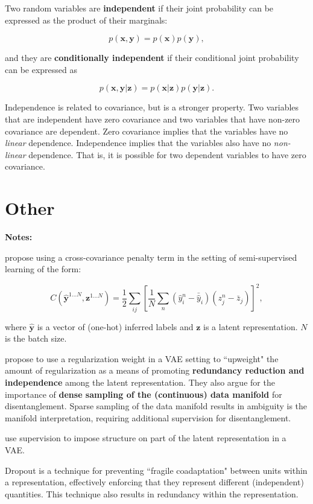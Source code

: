Two random variables are \textbf{independent} if their joint probability can be expressed as the product of their marginals:

\begin{equation}
	p(\mathbf{x}, \mathbf{y}) = p(\mathbf{x}) p(\mathbf{y}),
\end{equation}

\noindent and they are \textbf{conditionally independent} if their conditional joint probability can be expressed as

\begin{equation}
	p(\mathbf{x}, \mathbf{y} | \mathbf{z}) = p(\mathbf{x} | \mathbf{z}) p(\mathbf{y} | \mathbf{z}).
\end{equation}

Independence is related to covariance, but is a stronger property. Two variables that are independent have zero covariance and two variables that have non-zero covariance are dependent. Zero covariance implies that the variables have no \textit{linear} dependence. Independence implies that the variables also have no \textit{non-linear} dependence. That is, it is possible for two dependent variables to have zero covariance. 


\section{Other}
\noindent \textbf{Notes:}

\cite{cheung2014discovering} propose using a cross-covariance penalty term in the setting of semi-supervised learning of the form:

\begin{equation}
	C(\hat{\mathbf{y}}^{1 \dots N}, \mathbf{z}^{1 \dots N}) = \frac{1}{2} \sum_{ij} \left[ \frac{1}{N} \sum_n (\hat{y}^n_i - \bar{\hat{y}}_i) (z^n_j - \bar{z}_j) \right]^2,
\end{equation}

\noindent where $\hat{\mathbf{y}}$ is a vector of (one-hot) inferred labels and $\mathbf{z}$ is a latent representation. $N$ is the batch size.


\cite{higgins2016early} propose to use a regularization weight in a VAE setting to ``upweight" the amount of regularization as a means of promoting \textbf{redundancy reduction and independence} among the latent representation. They also argue for the importance of \textbf{dense sampling of the (continuous) data manifold} for disentanglement. Sparse sampling of the data manifold results in ambiguity is the manifold interpretation, requiring additional supervision for disentanglement.

\cite{siddharth2016inducing} use supervision to impose structure on part of the latent representation in a VAE.

Dropout \cite{srivastava2014dropout} is a technique for preventing ``fragile coadaptation" between units within a representation, effectively enforcing that they represent different (independent) quantities. This technique also results in redundancy within the representation.